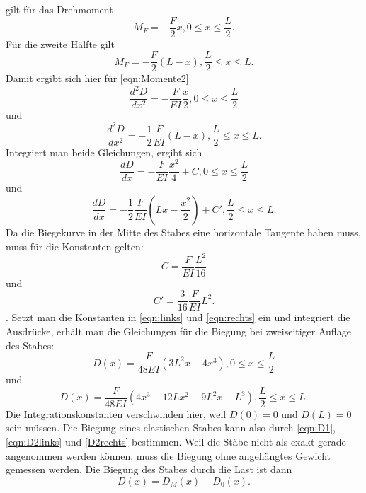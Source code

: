 gilt für das Drehmoment
\begin{equation}
M_{F} = - \frac{F}{2} x, 0 \leq x \leq \frac{L}{2}.
\end{equation}
Für die zweite Hälfte gilt
\begin{equation}
M_{F} = - \frac{F}{2} (L-x), \frac{L}{2} \leq x \leq L.
\end{equation}
Damit ergibt sich hier für \eqref{eqn:Momente2}
\begin{equation}
\frac{d^2D}{dx^2} = - \frac{F}{EI} \frac{x}{2}, 0 \leq x \leq \frac{L}{2}
\label{eqn:links}
\end{equation}
und
\begin{equation}
\frac{d^2D}{dx^2} = -\frac{1}{2} \frac{F}{EI} (L-x), \frac{L}{2} \leq x \leq L.
\label{eqn:rechts}
\end{equation}
Integriert man beide Gleichungen, ergibt sich 
\begin{equation}
\frac{dD}{dx} = - \frac{F}{EI} \frac{x^2}{4} + C , 0 \leq x \leq \frac{L}{2}
\end{equation}
und
\begin{equation}
\frac{dD}{dx} = - \frac{1}{2} \frac{F}{EI} (Lx-\frac{x^2}{2}) + C' , \frac{L}{2} \leq x \leq L.
\end{equation}
Da die Biegekurve in der Mitte des Stabes eine horizontale Tangente
haben muss, muss für die Konstanten gelten:
\begin{equation}
C = \frac{F}{EI} \frac{L^2}{16}
\end{equation}
und
\begin{equation}
C' = \frac{3}{16} \frac{F}{EI} L^2.
\end{equation}.
Setzt man die Konstanten in \eqref{eqn:links} und \eqref{eqn:rechts}
ein und integriert die Ausdrücke, erhält man die Gleichungen
für die Biegung bei zweiseitiger Auflage des Stabes:
\begin{equation}
D(x) = \frac{F}{48EI} (3L^2x - 4x^3), 0 \leq x \leq \frac{L}{2}
\label{eqn:D2links}
\end{equation}
und
\begin{equation}
D(x) = \frac{F}{48EI} (4x^3 - 12Lx^2 + 9L^2x - L^3) , \frac{L}{2} \leq x \leq L.
\label{eqn:D2rechts}
\end{equation}
Die Integrationskonstanten verschwinden hier, weil $D(0) = 0$ und $D(L) = 0$ sein müssen.
Die Biegung eines elastischen Stabes kann also durch
\eqref{eqn:D1}, \eqref{eqn:D2links} und \eqref{D2rechts} bestimmen.
Weil die Stäbe nicht als exakt gerade angenommen werden können,
muss die Biegung ohne angehängtes Gewicht gemessen werden.
Die Biegung des Stabes durch die Last ist dann 
\begin{equation}
D(x) = D_{M}(x) - D_{0}(x).
\end{equation}
